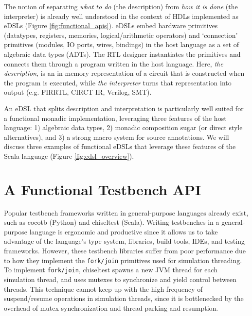 \documentclass[sigplan,review,nonacm,9pt]{acmart}
\begin{document}
The notion of separating \textit{what to do} (the description) from \textit{how it is done} (the interpreter) is already well understood in the context of HDLs implemented as eDSLs (Figure \ref{fig:functional_apis}).
eDSLs embed hardware primitives (datatypes, registers, memories, logical/arithmetic operators) and `connection' primitives (modules, IO ports, wires, bindings) in the host language as a set of algebraic data types (ADTs).
The RTL designer instantiates the primitives and connects them through a program written in the host language.
Here, \textit{the description}, is an in-memory representation of a circuit that is constructed when the program is executed, while \textit{the interpreter} turns that representation into output (e.g. FIRRTL\cite{firrtl}, CIRCT IR\cite{circt}, Verilog, SMT).

An eDSL that splits description and interpretation is particularly well suited for a functional monadic implementation, leveraging three features of the host language: 1) algebraic data types, 2) monadic composition sugar (or direct style alternatives\cite{dotty_cps_async, koka}), and 3) a strong macro system for source annotations.
We will discuss three examples of functional eDSLs that leverage these features of the Scala language (Figure \ref{fig:edsl_overview}).

\section{A Functional Testbench API}

Popular testbench frameworks written in general-purpose languages already exist, such as cocotb\cite{cocotb} (Python) and chiseltest\cite{chiseltest} (Scala).
Writing testbenches in a general-purpose language is ergonomic and productive since it allows us to take advantage of the language's type system, libraries, build tools, IDEs, and testing frameworks.
However, these testbench libraries suffer from poor performance due to how they implement the \texttt{fork/join} primitives used for simulation threading.
To implement \texttt{fork/join}, chiseltest spawns a new JVM thread for each simulation thread, and uses mutexes to synchronize and yield control between threads.
This technique cannot keep up with the high frequency of suspend/resume operations in simulation threads, since it is bottlenecked by the overhead of mutex synchronization and thread parking and resumption.
\end{document}
